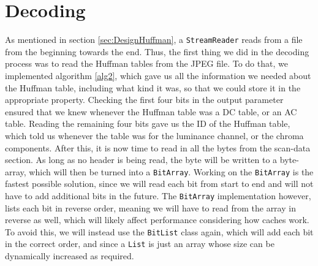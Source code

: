 \section{Decoding}
As mentioned in section \ref{sec:DesignHuffman}, a \lstinline|StreamReader| reads from a file from the beginning towards the end.
Thus, the first thing we did in the decoding process was to read the Huffman tables from the JPEG file. 
To do that, we implemented algorithm \ref{alg2}, which gave us all the information we needed about the Huffman table, including what kind it was, so that we could store it in the appropriate property. 
Checking the first four bits in the output parameter ensured that we knew whenever the Huffman table was a DC table, or an AC table. 
Reading the remaining four bits gave us the ID of the Huffman table, which told us whenever the table was for the luminance channel, or the chroma components.
After this, it is now time to read in all the bytes from the scan-data section. As long as no header is being read, the byte will be written to a byte-array, which will then be turned into a \lstinline|BitArray|.
Working on the \lstinline|BitArray| is the fastest possible solution, since we will read each bit from start to end and will not have to add additional bits in the future. The \lstinline|BitArray| implementation however, lists each bit in reverse order, meaning we will have to read from the array in reverse as well, which will likely affect performance considering how caches work.
To avoid this, we will instead use the \lstinline|BitList| class again, which will add each bit in the correct order, and since a \lstinline|List| is just an array whose size can be dynamically increased as required. 

